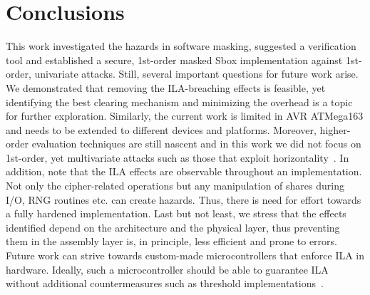 \section{Conclusions} \label{sec:conclusions}

This work investigated the hazards in software masking, suggested a verification tool and established a secure, 1st-order masked Sbox implementation against 1st-order, univariate attacks. Still, several important questions for future work arise. We demonstrated that removing the ILA-breaching effects is feasible, yet identifying the best clearing mechanism and minimizing the overhead is a topic for further exploration. Similarly, the current work is limited in AVR ATMega163 and needs to be extended to different devices and platforms. Moreover, higher-order evaluation techniques are still nascent and in this work we did not focus on 1st-order, yet multivariate attacks such as those that exploit horizontality~\cite{DBLP:conf/ches/BattistelloCPZ16}. In addition, note that the ILA effects are observable throughout an implementation. Not only the cipher-related operations but any manipulation of shares during I/O, RNG routines etc. can create hazards. Thus, there is need for effort towards a fully hardened implementation. Last but not least, we stress that the effects identified depend on the architecture and the physical layer, thus preventing them in the assembly layer is, in principle, less efficient and prone to errors. Future work can strive towards custom-made microcontrollers that enforce ILA in hardware. Ideally, such a microcontroller should be able to guarantee ILA without additional countermeasures such as threshold implementations~\cite{DBLP:conf/icics/NikovaRR06}.  